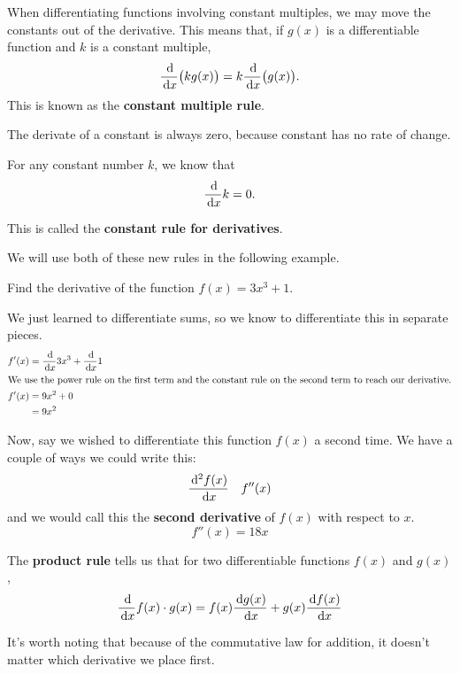 When differentiating functions involving constant multiples, we may move the constants out of the derivative.
This means that, if $g(x)$ is a differentiable function and $k$ is a constant multiple,
\[ \frac{\,\mathrm{d}}{\,\mathrm{d} x} \big( k g(x) \big) = k \frac{\,\mathrm{d}}{\,\mathrm{d} x} \big(g(x)\big).\]
This is known as the \textbf{constant multiple rule}.

The derivate of a constant is always zero, because constant has no rate of change.
\begin{theorem}
  For any constant number $k$, we know that
  \[\frac{\,\mathrm{d}}{\,\mathrm{d} x} k=0.\]
  \label{th:deriv:constantrule}
\end{theorem}
This is called the \textbf{constant rule for derivatives}.

We will use both of these new rules in the following example.
\begin{ex}
  Find the derivative of the function $f(x)=3x^3+1$.
  \begin{sol}
    We just learned to differentiate sums, so we know to differentiate this in separate pieces.
    \begin{align*}
      f'(x) &= \frac{\,\mathrm{d}}{\,\mathrm{d} x} 3x^3 + \frac{\,\mathrm{d}}{\,\mathrm{d} x} 1 \\
      \intertext{We use the power rule on the first term and the constant rule on the second term to reach our derivative.}
      f'(x)&= 9x^2+0 \\
      &=9x^2
    \end{align*}
  \end{sol}
  Now, say we wished to differentiate this function $f(x)$ a second time.
  We have a couple of ways we could write this:
  \begin{align*}
    \frac{\,\mathrm{d}^2 f(x)}{\,\mathrm{d} x} && f''(x)
  \end{align*}
  and we would call this the \textbf{second derivative} of $f(x)$ with respect to $x$.
  \[ f''(x) = 18x \]
\end{ex}

\begin{theorem}
  The \textbf{product rule} tells us that for two differentiable functions $f(x)$ and $g(x)$,
  \begin{equation}
    \frac{\,\mathrm{d}}{\,\mathrm{d} x} f(x) \cdot g(x) = f(x) \frac{\,\mathrm{d} g(x)}{\,\mathrm{d} x}+g(x)\frac{\,\mathrm{d} f(x)}{\,\mathrm{d} x}
    \label{eq:productrule}
  \end{equation}
  \label{thm:productrule}
\end{theorem}
  It's worth noting that because of the commutative law for addition, it doesn't matter which derivative we place first.

